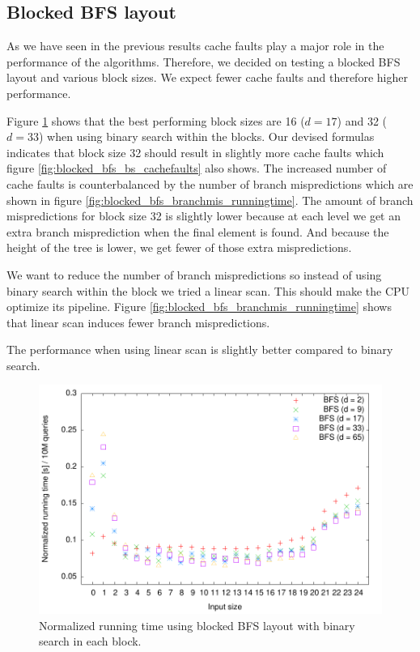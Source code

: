 \subsection{Blocked BFS layout}

As we have seen in the previous results cache faults play a major role in the performance of the algorithms. Therefore, we decided on testing a blocked BFS layout and various block sizes. We expect fewer cache faults and therefore higher performance.

Figure \ref{fig:blocked_bfs_bs_runningtime} shows that the best performing block sizes are 16 ($d = 17$) and 32 ($d = 33$) when using binary search within the blocks. Our devised formulas indicates that block size 32 should result in slightly more cache faults which figure \ref{fig:blocked_bfs_bs_cachefaults} also shows. The increased number of cache faults is counterbalanced by the number of branch mispredictions which are shown in figure \ref{fig:blocked_bfs_branchmis_runningtime}. The amount of branch mispredictions for block size 32 is slightly lower because at each level we get an extra branch misprediction when the final element is found. And because the height of the tree is lower, we get fewer of those extra mispredictions.

We want to reduce the number of branch mispredictions so instead of using binary search within the block we tried a linear scan. This should make the CPU optimize its pipeline. Figure \ref{fig:blocked_bfs_branchmis_runningtime} shows that linear scan induces fewer branch mispredictions.

The performance when using linear scan is slightly better compared to binary search.


\begin{figure}[h!]
  \centering
  \includegraphics[width=\textwidth]{../week1/plots/outputs/Btree_bs_runningtime}
  \caption{Normalized running time using blocked BFS layout with binary search in each block.}
  \label{fig:blocked_bfs_bs_runningtime}
\end{figure}

